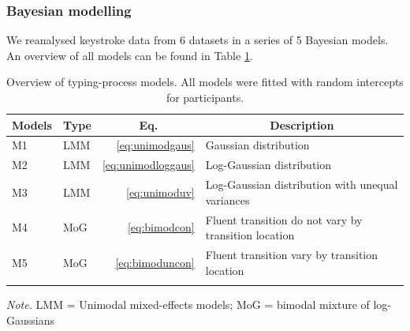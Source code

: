\documentclass[
  english,
  man,floatsintext]{apa7}
\begin{document}
\hypertarget{bayesian-modelling}{%
\subsubsection{Bayesian modelling}\label{bayesian-modelling}}

We reanalysed keystroke data from 6 datasets in a series of 5 Bayesian models. An overview of all models can be found in Table \ref{tab:models}.

\begin{table}[tbp]

\begin{center}
\begin{threeparttable}

\caption{\label{tab:models}Overview of typing-process models. All models were fitted with random intercepts for participants.}

\begin{tabular}{llrp{9cm}}
\toprule
Models & \multicolumn{1}{c}{Type} & \multicolumn{1}{c}{Eq.} & \multicolumn{1}{c}{Description}\\
\midrule
M1 & LMM & \ref{eq:unimodgaus} & Gaussian distribution\\
M2 & LMM & \ref{eq:unimodloggaus} & Log-Gaussian distribution\\
M3 & LMM & \ref{eq:unimoduv} & Log-Gaussian distribution with unequal variances\\
M4 & MoG & \ref{eq:bimodcon} & Fluent transition do not vary by transition location\\
M5 & MoG & \ref{eq:bimoduncon} & Fluent transition vary by transition location\\
\bottomrule
\addlinespace
\end{tabular}

\begin{tablenotes}[para]
\normalsize{\textit{Note.} LMM = Unimodal mixed-effects models; MoG = bimodal mixture of log-Gaussians}
\end{tablenotes}

\end{threeparttable}
\end{center}

\end{table}
\end{document}

